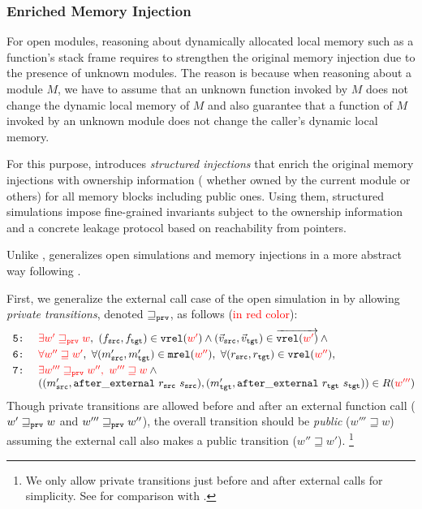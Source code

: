 {\subsubsection{Enriched Memory Injection}
\label{sec:overview-verification:injection:dynamic}
%
For open modules, reasoning about dynamically allocated local memory
such as a function's stack frame requires to strengthen the original
memory injection due to the presence of unknown modules.  The reason
is because when reasoning about a module $M$, we have to assume that
an unknown function invoked by $M$ does not change the dynamic local
memory of $M$ and also guarantee that a function of $M$ invoked by an
unknown module does not change the caller's dynamic local memory.

For this purpose, \ccc{} introduces \emph{structured injections} that
enrich the original memory injections with ownership information (\ie
whether owned by the current module or others) for all memory blocks
including public ones.  Using them, structured simulations impose
fine-grained invariants subject to the ownership information and a
concrete leakage protocol based on reachability from pointers.

Unlike \ccc{}, \ccm{} generalizes open simulations and memory injections
in a more abstract way following \cite{DBLP:conf/icfp/DreyerNB10,pb}.

First, we generalize the external call case of the open simulation in 
by allowing \emph{private transitions}, denoted $\sqsupseteq_{\texttt{prv}}$,
as follows (\textcolor{red}{in red color}):
\[
\begin{array}{@{}l@{}}
\texttt{ 5:}~\quad \textcolor{red}{\exists w' \sqsupseteq_\weak w},~ (f_\src,f_\tgt)\in \texttt{vrel}(\textcolor{red}{w'}) \land (\vec{v}_\src,\vec{v}_\tgt) \in \overrightarrow{\texttt{vrel}(\textcolor{red}{w'})} \land{} \\[1mm]
\texttt{ 6:}~\quad \textcolor{red}{\forall w'' \sqsupseteq w'},~\forall (\memsrc',\memtgt')\in\texttt{mrel}(\textcolor{red}{w''}),~ \forall (r_\src,r_\tgt)\in \texttt{vrel}(\textcolor{red}{w''}),\\[1mm]
\texttt{ 7:}~\quad \textcolor{red}{\exists w''' \sqsupseteq_\weak w'',~ w''' \sqsupseteq w} \land {} \\
\phantom{\texttt{ 7:}}~\quad ((\memsrc',\mathtt{after\_external}~r_\src~\stsrc),(\memtgt',\mathtt{after\_external}~r_\tgt~\sttgt))\in R(\textcolor{red}{w'''})
\end{array}
\]
Though private transitions are allowed before and after an external function call (\ie
$w' \sqsupseteq_{\texttt{prv}} w$ and $w''' \sqsupseteq_{\texttt{prv}} w''$),
the overall transition should be \emph{public} (\ie $w''' \sqsupseteq w$)
assuming the external call also makes a public transition (\ie $w'' \sqsupseteq w'$).%
\footnote{We only allow private transitions just before and after external calls for simplicity.
See  for comparison with \cite{DBLP:conf/icfp/DreyerNB10,pb}.}

}
